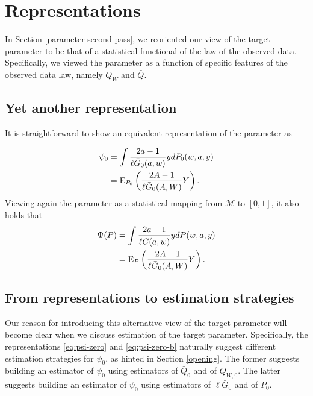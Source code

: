 \documentclass[11pt,openright,twoside]{book}
\newcommand{\calM}{\mathcal{M}}
\newcommand{\Exp}{\textrm{E}}
\newcommand{\Gbar}{\bar{G}}
\newcommand{\Qbar}{\bar{Q}}
\theoremstyle{definition}
\theoremstyle{definition}
\theoremstyle{definition}
\theoremstyle{remark}
\begin{document}
\hypertarget{parameter-third-pass}{%
\section{Representations}\label{parameter-third-pass}}

In Section \ref{parameter-second-pass}, we reoriented our view of the target
parameter to be that of a statistical functional of the law of the observed
data. Specifically, we viewed the parameter as a function of specific features
of the observed data law, namely \(Q_{W}\) and \(\Qbar\).

\hypertarget{yet-another}{%
\subsection{Yet another representation}\label{yet-another}}

It is straightforward to \protect\hyperlink{another-rep}{show an equivalent representation} of
the parameter as

\begin{align}  \notag  \psi_{0}  &=  \int \frac{2a  -  1}{\ell\Gbar_0(a,w)}  y
dP_0(w,a,y)   \\   \label{eq:psi-zero-b}   &=   \Exp_{P_0}   \left(   \frac{2A   -
1}{\ell\Gbar_{0}(A,W)} Y \right).  \end{align} Viewing again the parameter as
a statistical mapping from \(\calM\) to \([0,1]\), it also holds that
\begin{align} \notag  \Psi(P) &= \int \frac{2a-1}{\ell\Gbar(a,w)}  y dP(w,a,y)
\\  \label{eq:psi-zero-c}  &=  \Exp_{P}\left(\frac{2A -  1}{\ell\Gbar_{0}(A,W)}  Y
\right).  \end{align}

\hypertarget{rep-to-est}{%
\subsection{From representations to estimation strategies}\label{rep-to-est}}

Our reason for introducing this alternative view of the target parameter will
become clear when we discuss estimation of the target parameter. Specifically,
the representations \eqref{eq:psi-zero} and \eqref{eq:psi-zero-b} naturally
suggest different estimation strategies for \(\psi_0\), as hinted in Section
\ref{opening}. The former suggests building an estimator of \(\psi_0\) using
estimators of \(\Qbar_0\) and of \(Q_{W,0}\). The latter suggests building an
estimator of \(\psi_0\) using estimators of \(\ell\Gbar_0\) and of \(P_0\).
\end{document}

